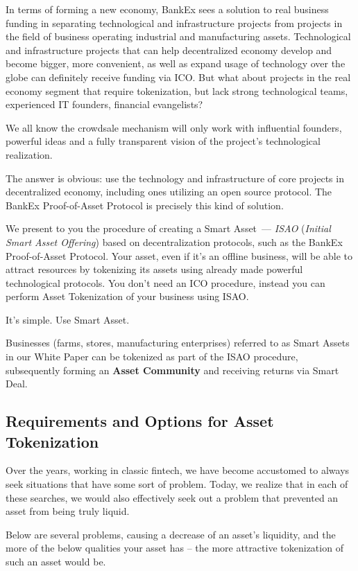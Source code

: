 \documentclass{article}
\begin{document}
\begin{multicols}{2}
In terms of forming a new economy, BankEx sees a solution to real business funding in separating technological and infrastructure projects from projects in the field of business operating industrial and manufacturing assets. Technological and infrastructure projects that can help decentralized economy develop and become bigger, more convenient, as well as expand usage of technology over the globe can definitely receive funding via ICO. But what about projects in the real economy segment that require tokenization, but lack strong technological teams, experienced IT founders, financial evangelists?

We all know the crowdsale mechanism will only work with influential founders, powerful ideas and a fully transparent vision of the project’s technological realization.  

The answer is obvious: use the technology and infrastructure of core projects in decentralized economy, including ones utilizing an open source protocol. The BankEx Proof-of-Asset Protocol is precisely this kind of solution. 

We present to you the procedure of creating a Smart Asset~--- \textit{ISAO} (\textit{Initial Smart Asset Offering}) based on decentralization protocols, such as the BankEx Proof-of-Asset Protocol. Your asset, even if it’s an offline business, will be able to attract resources by tokenizing its assets using already made powerful technological protocols. You don’t need an ICO procedure, instead you can perform Asset Tokenization of your business using ISAO. 

It’s simple. Use Smart Asset.  

Businesses (farms, stores, manufacturing enterprises) referred to as Smart Assets in our White Paper can be tokenized as part of the ISAO procedure, subsequently forming an \textbf{Asset Community} and receiving returns via Smart Deal.

\subsection{Requirements and Options for Asset Tokenization}

Over the years, working in classic fintech, we have become accustomed to always seek situations that have some sort of problem. Today, we realize that in each of these searches, we would also effectively seek out a problem that prevented an asset from being truly liquid. 

Below are several problems, causing a decrease of an asset’s liquidity, and the more of the below qualities your asset has – the more attractive tokenization of such an asset would be. 


\end{multicols}
\end{document}
